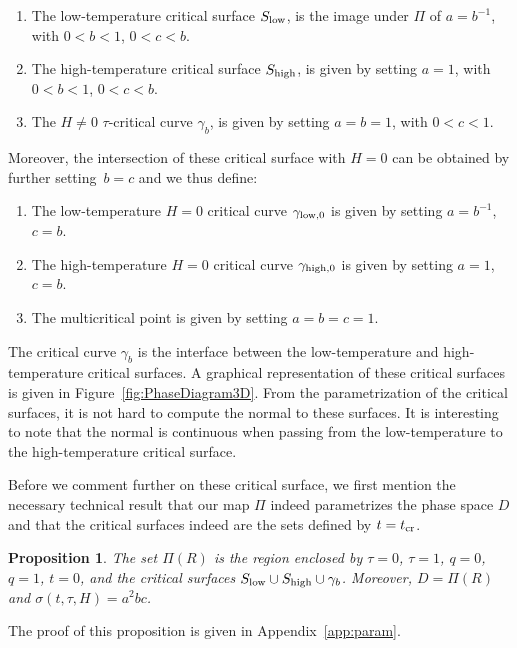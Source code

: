 \documentclass[pdftex]{sigma}
\numberwithin{equation}{section}
\newtheorem{Proposition}[Theorem]{Proposition}
 { \theoremstyle{definition}
\newtheorem{Definition}[Theorem]{Definition}
\newtheorem{Note}[Theorem]{Note}
\newtheorem{Example}[Theorem]{Example}
\newtheorem{Remark}[Theorem]{Remark} }
\begin{document}
 \begin{Definition} \label{defn:criticalsurfaces} \quad
 \begin{enumerate}\itemsep=0pt
 \item[$(1)$] The low-temperature critical surface $S_{{\rm low}}$, is the image under $\Pi$ of ${a=b^{-1}}$, with $0<b <1$, $0<c<b$.
 \item[$(2)$] The high-temperature critical surface $S_{{\rm high}}$, is given by setting $a=1$, with $0 < b < 1$, $0< c < b$.
 \item[$(3)$] The $H\neq 0$ $\tau$-critical curve $\gamma_b$, is given by setting $a=b=1$, with $0 < c <1$.
 \end{enumerate}
 Moreover, the intersection of these critical surface with $H=0$ can be obtained by further setting~${b=c}$ and we thus define:
 \begin{enumerate}\itemsep=0pt
 \item[$(4)$] The low-temperature $H=0$ critical curve $\gamma_{{\rm low},0}$ is given by setting $a=b^{-1}$, $c=b$.
 \item[$(5)$] The high-temperature $H=0$ critical curve $\gamma_{{\rm high},0}$ is given by setting $a=1$, $c=b$.
 \item[$(6)$] The multicritical point is given by setting $a = b = c = 1$.
 \end{enumerate}
 \end{Definition}
 The critical curve $\gamma_b$ is the interface between the low-temperature and high-temperature critical surfaces. A graphical representation of these critical surfaces is given in Figure~\ref{fig:PhaseDiagram3D}. From the parametrization of the critical surfaces, it is not hard to compute the normal to these surfaces. It is interesting to note that the normal is continuous when passing from the low-temperature to the high-temperature critical surface.

 Before we comment further on these critical surface, we first mention the necessary technical result that our map $\Pi$ indeed parametrizes the phase space $ D$ and that the critical surfaces indeed are the sets defined by $t=t_{\rm cr}$.

 \begin{Proposition} \label{prop:phase} The set $\Pi(R)$ is the region enclosed by $\tau=0$, $\tau=1$, $q=0$, $q=1$, $t=0$, and the critical surfaces $S_{{\rm low}}\cup S_{{\rm high}}\cup \gamma_b$. Moreover, $D=\Pi(R)$ and $\sigma(t,\tau,H)=a^2bc$.
 \end{Proposition}
 The proof of this proposition is given in Appendix~\ref{app:param}.
\end{document}
